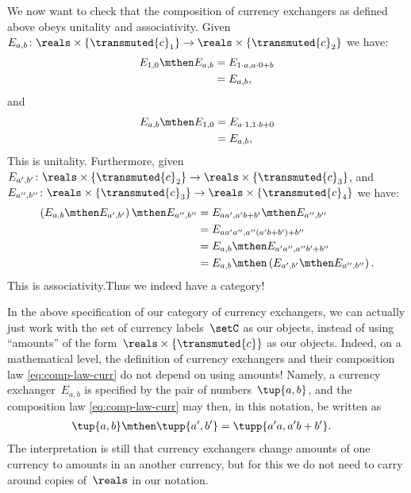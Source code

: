 We now want to check that the composition of currency exchangers as defined above obeys unitality and associativity. Given~$E_{a,b}\colon \reals \times \{\transmuted{c}_1\}\to \reals \times \{\transmuted{c}_2\}$ we have:
\begin{equation*}
    \begin{aligned}
        E_{1,0}\mthen E_{a,b}&=E_{1\cdot a, a\cdot 0+b}\\
        &=E_{a,b},
    \end{aligned}
\end{equation*}
and
\begin{equation*}
    \begin{aligned}
        E_{a,b}\mthen E_{1,0}&=E_{a\cdot 1, 1\cdot b+0}\\
        &=E_{a,b},
    \end{aligned}
\end{equation*}
This is unitality. Furthermore, given~$E_{a',b'}\colon \reals \times \{\transmuted{c}_2\}\to \reals\times \{\transmuted{c}_3\}$, and~$E_{a'',b''}\colon \reals \times \{\transmuted{c}_3\}\to \reals \times \{\transmuted{c}_4\}$ we have:
\begin{equation*}
    \begin{aligned}
        \left( E_{a,b}\mthen E_{a',b'}\right)\mthen E_{a'',b''}&=E_{aa',a'b+b'}\mthen E_{a'',b''}\\
        &=E_{aa'a'',a''(a'b+b')+b''}\\
        &=E_{a,b}\mthen E_{a'a'',a''b'+b''}\\
        &=E_{a,b}\mthen \left( E_{a',b'}\mthen E_{a'',b''}\right).
    \end{aligned}
\end{equation*}
This is associativity.Thus we indeed have a category!

\begin{remark}
    In the above specification of our category of currency exchangers, we can actually just work with the set of currency labels~$\setC$ as our objects, instead of using ``amounts'' of the form~$\reals \times \{\transmuted{c}\}$ as our objects.
    Indeed, on a mathematical level, the definition of currency exchangers and their composition law \cref{eq:comp-law-curr} do not depend on using amounts!
    Namely, a currency exchanger~$E_{a,b}$ is specified by the pair of numbers~$\tup{a, b}$, and the composition law \cref{eq:comp-law-curr} may then, in this notation, be written as
    \begin{equation}
        \begin{aligned}
            \label{eq:currencycomp}
            \tup{a,b}\mthen \tupp{a',b'}&=\tupp{a' a, a' b + b'}.
        \end{aligned}
    \end{equation}
    The interpretation is still that currency exchangers change amounts of one currency to amounts in an another currency, but for this we do not need to carry around copies of~$\reals$ in our notation.
\end{remark}

